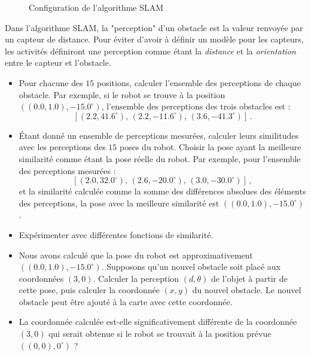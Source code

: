 \begin{figure}
\begin{center}
\caption{Configuration de l'algorithme SLAM}
\label{fig.slam-config}
\end{center}
\end{figure}

Dans l'algorithme SLAM, la "perception" d'un obstacle est la valeur renvoyée par un capteur de distance. Pour éviter d'avoir à définir un modèle pour les capteurs, les activités définiront une perception comme étant la \emph{distance} et la \emph{orientation} entre le capteur et l'obstacle.

\begin{framed}
\begin{itemize}
\item Pour chacune des $15$ positions, calculer l'ensemble des perceptions de chaque obstacle. Par exemple, si le robot se trouve à la position $((0.0,1.0),-15.0^\circ)$, l'ensemble des perceptions des trois obstacles est :
\[
[( 2.2,  41.6^\circ),\,  ( 2.2, -11.6^\circ),\,  ( 3.6, -41.3^\circ)]\,.
\]
\item Étant donné un ensemble de perceptions mesurées, calculer leurs similitudes avec les perceptions des $15$ poses du robot. Choisir la pose ayant la meilleure similarité comme étant la pose réelle du robot. Par exemple, pour l'ensemble des perceptions mesurées :
\[
[( 2.0,  32.0^\circ),\,  ( 2.6, -20.0^\circ),\,  ( 3.0, -30.0^\circ)]\,,
\]
et la similarité calculée comme la somme des différences absolues des éléments des perceptions, la pose avec la meilleure similarité est $((0.0, 1.0),-15.0^\circ)$.
\item Expérimenter avec différentes fonctions de similarité.
\item Nous avons calculé que la pose du robot est approximativement $((0.0, 1.0),-15.0^\circ)$. Supposons qu'un nouvel obstacle soit placé aux coordonnées $(3,0)$. Calculer la perception $(d,\theta)$ de l'objet à partir de cette pose, puis calculer la coordonnée $(x,y)$ du nouvel obstacle. Le nouvel obstacle peut être ajouté à la carte avec cette coordonnée.
\item La coordonnée calculée est-elle significativement différente de la coordonnée $(3,0)$ qui serait obtenue si le robot se trouvait à la position prévue $((0,0),0^\circ)$ ?
\end{itemize}
\end{framed}

